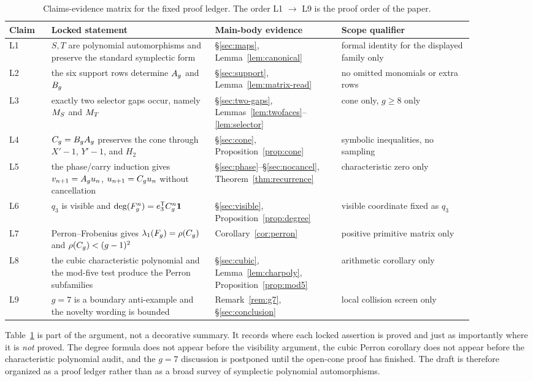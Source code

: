 \documentclass[11pt]{article}
\theoremstyle{remark}
\numberwithin{equation}{section}
\begin{document}
\begin{table}[t]
\centering
\small
\begin{tabular}{p{0.08\linewidth}p{0.31\linewidth}p{0.24\linewidth}p{0.25\linewidth}}
\toprule
Claim & Locked statement & Main-body evidence & Scope qualifier \\
\midrule
L1 & \(S,T\) are polynomial automorphisms and preserve the standard symplectic form & §\ref{sec:maps}, Lemma~\ref{lem:canonical} & formal identity for the displayed family only \\
L2 & the six support rows determine \(A_g\) and \(B_g\) & §\ref{sec:support}, Lemma~\ref{lem:matrix-read} & no omitted monomials or extra rows \\
L3 & exactly two selector gaps occur, namely \(M_S\) and \(M_T\) & §\ref{sec:two-gaps}, Lemmas~\ref{lem:twofaces}--\ref{lem:selector} & cone only, \(g\geq 8\) only \\
L4 & \(C_g=B_gA_g\) preserves the cone through \(X'-1\), \(Y'-1\), and \(H_2\) & §\ref{sec:cone}, Proposition~\ref{prop:cone} & symbolic inequalities, no sampling \\
L5 & the phase/carry induction gives \(v_{n+1}=A_g u_n\), \(u_{n+1}=C_g u_n\) without cancellation & §\ref{sec:phase}--§\ref{sec:nocancel}, Theorem~\ref{thm:recurrence} & characteristic zero only \\
L6 & \(q_3\) is visible and \(\operatorname{deg}(F_g^n)=e_3^{\mathsf T}C_g^n\mathbf{1}\) & §\ref{sec:visible}, Proposition~\ref{prop:degree} & visible coordinate fixed as \(q_3\) \\
L7 & Perron--Frobenius gives \(\lambda_1(F_g)=\rho(C_g)\) and \(\rho(C_g)<(g-1)^2\) & Corollary~\ref{cor:perron} & positive primitive matrix only \\
L8 & the cubic characteristic polynomial and the mod-five test produce the Perron subfamilies & §\ref{sec:cubic}, Lemma~\ref{lem:charpoly}, Proposition~\ref{prop:mod5} & arithmetic corollary only \\
L9 & \(g=7\) is a boundary anti-example and the novelty wording is bounded & Remark~\ref{rem:g7}, §\ref{sec:conclusion} & local collision screen only \\
\bottomrule
\end{tabular}
\caption{Claims-evidence matrix for the fixed proof ledger.  The order L1 \(\rightarrow\) L9 is the proof order of the paper.}
\label{tab:claims}
\end{table}

Table~\ref{tab:claims} is part of the argument, not a decorative summary.  It
records where each locked assertion is proved and just as importantly where it
is \emph{not} proved.  The degree formula does not appear before the visibility
argument, the cubic Perron corollary does not appear before the characteristic
polynomial audit, and the \(g=7\) discussion is postponed until the open-cone
proof has finished.  The draft is therefore organized as a proof ledger rather
than as a broad survey of symplectic polynomial automorphisms.
\end{document}

